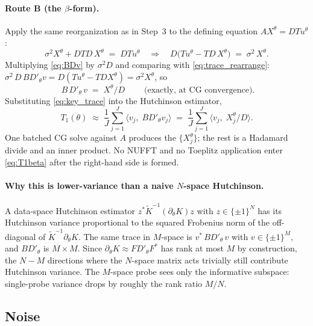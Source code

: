 \documentclass[11pt]{article}
\numberwithin{equation}{section}
\newcommand{\Ktil}{\widetilde K}
\newcommand{\Amean}{A}
\begin{document}
\paragraph{Route B (the $\beta$-form).} Apply the same reorganization as in
Step~3 to the defining equation $\Amean X^\theta = DTu^\theta$:
\begin{equation}
  \sigma^2 X^\theta + DTD\,X^\theta \;=\; DT u^\theta
  \quad\Longrightarrow\quad
  D\bigl(T u^\theta - T D\,X^\theta\bigr) \;=\; \sigma^2\,X^\theta.
  \label{eq:trace_rearrange}
\end{equation}
Multiplying \eqref{eq:BDv} by $\sigma^2 D$ and comparing with
\eqref{eq:trace_rearrange}: $\sigma^2\,D\,BD'_\theta v = D(Tu^\theta -
TDX^\theta) = \sigma^2 X^\theta$, so
\begin{equation}
  \boxed{\;B\,D'_\theta\,v \;=\; X^\theta/D\;}\qquad\text{(exactly, at CG convergence)}.
  \label{eq:key_trace}
\end{equation}
Substituting \eqref{eq:key_trace} into the Hutchinson estimator,
\begin{equation}
  T_1(\theta) \;\approx\; \frac{1}{J}\sum_{j=1}^{J}\bigl\langle v_j,\; B D'_\theta v_j\bigr\rangle
              \;=\; \frac{1}{J}\sum_{j=1}^{J}\bigl\langle v_j,\; X^\theta_j/D\bigr\rangle.
  \label{eq:T1beta}
\end{equation}
One batched CG solve against $\Amean$ produces the $\{X^\theta_j\}$; the rest
is a Hadamard divide and an inner product. No NUFFT and no Toeplitz application
enter \eqref{eq:T1beta} after the right-hand side is formed.

\paragraph{Why this is lower-variance than a naive $N$-space Hutchinson.}
A data-space Hutchinson estimator $z^*\Ktil^{-1}(\partial_\theta K)z$ with
$z\in\{\pm1\}^N$ has its Hutchinson variance proportional to the squared
Frobenius norm of the off-diagonal of $\Ktil^{-1}\partial_\theta K$. The same
trace in $M$-space is $v^*\,BD'_\theta\,v$ with $v\in\{\pm1\}^M$, and
$BD'_\theta$ is $M\times M$. Since $\partial_\theta K \approx FD'_\theta F^*$
has rank at most $M$ by construction, the $N\!-\!M$ directions where the
$N$-space matrix acts trivially still contribute Hutchinson variance. The
$M$-space probe sees only the informative subspace: single-probe variance drops
by roughly the rank ratio $M/N$.

\subsection*{Noise}
\end{document}

